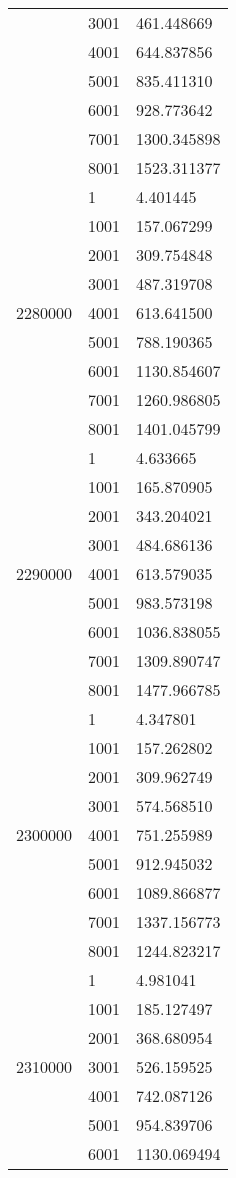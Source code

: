 \begin{table}[htb!]
\begin{tabular}{lll}
 & 3001 & 461.448669 \\
 & 4001 & 644.837856 \\
 & 5001 & 835.411310 \\
 & 6001 & 928.773642 \\
 & 7001 & 1300.345898 \\
 & 8001 & 1523.311377 \\
\multirow[c]{9}{*}{2280000} & 1 & 4.401445 \\
 & 1001 & 157.067299 \\
 & 2001 & 309.754848 \\
 & 3001 & 487.319708 \\
 & 4001 & 613.641500 \\
 & 5001 & 788.190365 \\
 & 6001 & 1130.854607 \\
 & 7001 & 1260.986805 \\
 & 8001 & 1401.045799 \\
\multirow[c]{9}{*}{2290000} & 1 & 4.633665 \\
 & 1001 & 165.870905 \\
 & 2001 & 343.204021 \\
 & 3001 & 484.686136 \\
 & 4001 & 613.579035 \\
 & 5001 & 983.573198 \\
 & 6001 & 1036.838055 \\
 & 7001 & 1309.890747 \\
 & 8001 & 1477.966785 \\
\multirow[c]{9}{*}{2300000} & 1 & 4.347801 \\
 & 1001 & 157.262802 \\
 & 2001 & 309.962749 \\
 & 3001 & 574.568510 \\
 & 4001 & 751.255989 \\
 & 5001 & 912.945032 \\
 & 6001 & 1089.866877 \\
 & 7001 & 1337.156773 \\
 & 8001 & 1244.823217 \\
\multirow[c]{9}{*}{2310000} & 1 & 4.981041 \\
 & 1001 & 185.127497 \\
 & 2001 & 368.680954 \\
 & 3001 & 526.159525 \\
 & 4001 & 742.087126 \\
 & 5001 & 954.839706 \\
 & 6001 & 1130.069494 \\

\end{tabular}
\end{table}
